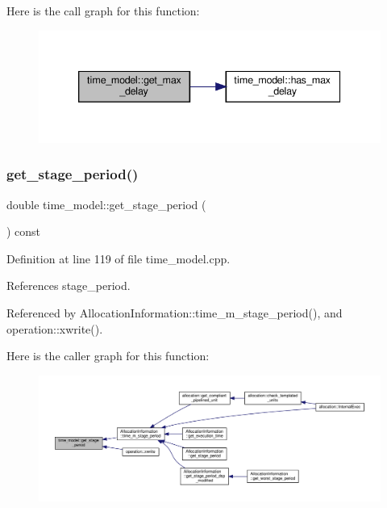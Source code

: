 Here is the call graph for this function\+:
\nopagebreak
\begin{figure}[H]
\begin{center}
\leavevmode
\includegraphics[width=339pt]{d3/d73/classtime__model_ad5c3137763e7080054586c28cdfb8627_cgraph}
\end{center}
\end{figure}
\mbox{\label{classtime__model_a7283fa75e6f6dc3bfa8e4c579d56f656}} 
\subsubsection{\texorpdfstring{get\+\_\+stage\+\_\+period()}{get\_stage\_period()}}
{\footnotesize\ttfamily double time\+\_\+model\+::get\+\_\+stage\+\_\+period (\begin{DoxyParamCaption}{ }\end{DoxyParamCaption}) const}



Definition at line 119 of file time\+\_\+model.\+cpp.



References stage\+\_\+period.



Referenced by Allocation\+Information\+::time\+\_\+m\+\_\+stage\+\_\+period(), and operation\+::xwrite().

Here is the caller graph for this function\+:
\nopagebreak
\begin{figure}[H]
\begin{center}
\leavevmode
\includegraphics[width=350pt]{d3/d73/classtime__model_a7283fa75e6f6dc3bfa8e4c579d56f656_icgraph}
\end{center}
\end{figure}
\mbox{\label{classtime__model_a45cff932d6a65cc0fa68ac30b2222c19}} 
